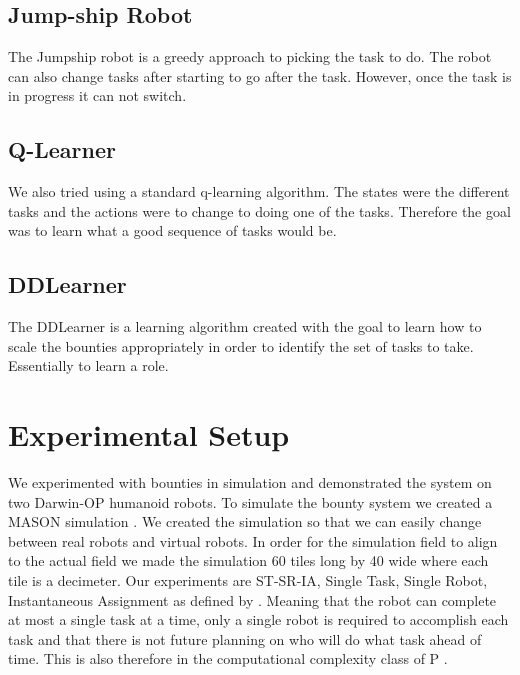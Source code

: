 \documentclass[twocolumn]{article}
\begin{document}
\subsection{Jump-ship Robot}
The Jumpship robot is a greedy approach to picking the task to do.  The robot can also change tasks after starting to go after the task.  However, once the task is in progress it can not switch.
\subsection{Q-Learner}
We also tried using a standard q-learning algorithm.  The states were the different tasks and the actions were to change to doing one of the tasks.  Therefore the goal was to learn what a good sequence of tasks would be.
\subsection{DDLearner}
The DDLearner is a learning algorithm created with the goal to learn how to scale the bounties appropriately in order to identify the set of tasks to take.  Essentially to learn a role.  


\section{Experimental Setup}

We experimented with bounties in simulation and demonstrated the system on two Darwin-OP humanoid robots.  To simulate the bounty system we created a MASON simulation \cite{Luke2003}.  We created the simulation so that we can easily change between real robots and virtual robots.  In order for the simulation field to align to the actual field we made the simulation 60 tiles long by 40 wide where each tile is a decimeter.  Our experiments are ST-SR-IA, Single Task, Single Robot, Instantaneous Assignment as defined by \cite{Gerkey2004}.  Meaning that the robot can complete at most a single task at a time, only a single robot is required to accomplish each task and that there is not future planning on who will do what task ahead of time.  This is also therefore in the computational complexity class of P \cite{Campbell2010, Gerkey2003}.

\end{document}
